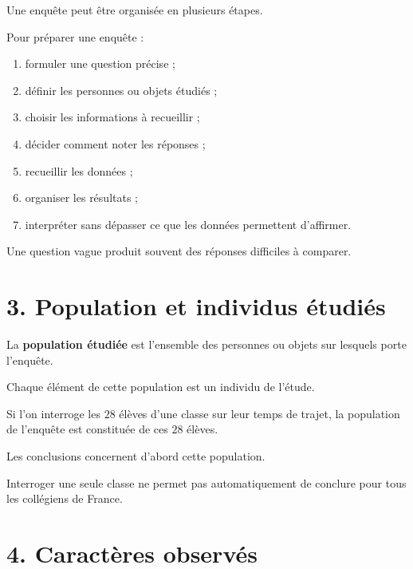 Une enquête peut être organisée en plusieurs étapes.


\begin{methode}
Pour préparer une enquête :
\begin{enumerate}
\item formuler une question précise ;
\item définir les personnes ou objets étudiés ;
\item choisir les informations à recueillir ;
\item décider comment noter les réponses ;
\item recueillir les données ;
\item organiser les résultats ;
\item interpréter sans dépasser ce que les données permettent d'affirmer.
\end{enumerate}
\end{methode}

Une question vague produit souvent des réponses difficiles à comparer.

\section{3. Population et individus étudiés}

La \textbf{population étudiée} est l'ensemble des personnes ou objets sur lesquels porte l'enquête.

Chaque élément de cette population est un individu de l'étude.

\begin{exemple}
Si l'on interroge les $28$ élèves d'une classe sur leur temps de trajet, la population de l'enquête est constituée de ces $28$ élèves.
\end{exemple}

Les conclusions concernent d'abord cette population.

Interroger une seule classe ne permet pas automatiquement de conclure pour tous les collégiens de France.

\section{4. Caractères observés}

